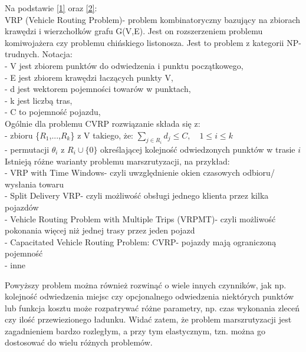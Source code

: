 \documentclass[a4paper, twoside, 12pt, justified]{article}
\begin{document}
	Na podstawie \hyperlink{vrp}{[1]} oraz \hyperlink{cvrp}{[2]}:\\
	VRP (Vehicle Routing Problem)- problem kombinatoryczny bazujący na zbiorach krawędzi i wierzchołków grafu G(V,E). Jest on rozszerzeniem problemu komiwojażera czy problemu chińskiego listonosza. Jest to problem z kategorii NP- trudnych. Notacja: \\
	- V jest zbiorem punktów do odwiedzenia i punktu początkowego,\\
	- E jest zbiorem krawędzi łaczących punkty V,\\
	- d jest wektorem pojemności towarów w punktach,\\
	- k jest liczbą tras,\\
	- C to pojemność pojazdu,\\
	
	Ogólnie dla problemu CVRP rozwiązanie składa się z:\\
	- zbioru \{$R_{1}$,...,$R_{k}$\} z V takiego, że:  $\sum_{j \in R_i} d_j \leq C, \quad 1 \leq i \leq k$ \\
	- permutacji $\theta_i$ z $R_i \cup \{0\}$ określającej kolejność odwiedzonych punktów w trasie $i$\\
	
	Istnieją różne warianty problemu marszrutyzacji, na przykład:\\ 
	- VRP with Time Windows- czyli uwzględnienie okien czasowych odbioru/ wysłania towaru\\
	- Split Delivery VRP- czyli możliwość obsługi jednego klienta przez kilka pojazdów\\
	- Vehicle Routing Problem with Multiple Trips (VRPMT)- czyli możliwość pokonania więcej niż jednej trasy przez jeden pojazd\\
	- Capacitated Vehicle Routing Problem: CVRP- pojazdy mają ograniczoną pojemność\\ 
	- inne

	\vspace{5mm} %

	Powyższy problem można również rozwinąć o wiele innych czynników, jak np. kolejność odwiedzenia miejsc czy opcjonalnego odwiedzenia niektórych punktów lub funkcja kosztu może rozpatrywać różne parametry, np. czas wykonania zleceń czy ilość przewiezionego ładunku. Widać zatem, że problem marszrutyzacji jest zagadnieniem bardzo rozległym, a przy tym elastycznym, tzn. można go dostosować do wielu różnych problemów.
	
	\vspace{5mm}
	
\end{document}
